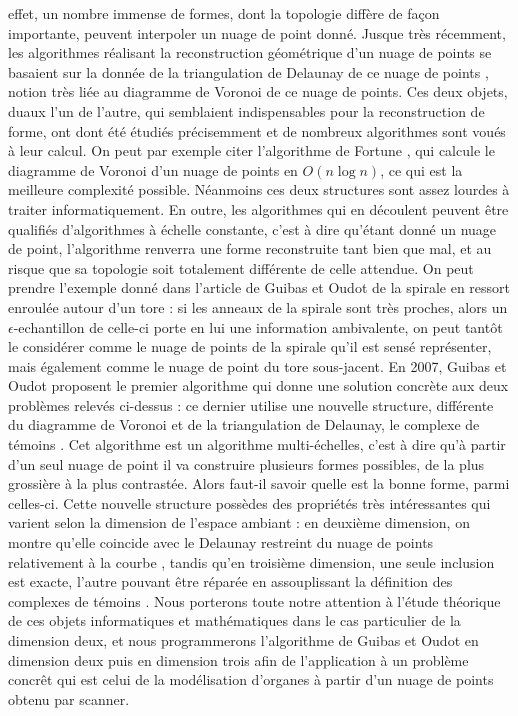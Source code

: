 \documentclass{article}
\begin{document}
effet, un nombre immense de formes, dont la topologie diffère de façon importante, peuvent interpoler un nuage de point donné. Jusque très récemment, les algorithmes réalisant la reconstruction géométrique d'un nuage de points se basaient sur la donnée de la triangulation de Delaunay de ce nuage de points \cite{lyon}, notion très liée au diagramme de Voronoi de ce nuage de points. Ces deux objets, duaux l'un de l'autre, qui semblaient indispensables pour la reconstruction de forme, ont dont été étudiés précisemment et de nombreux algorithmes sont voués à leur calcul. On peut par exemple citer l'algorithme de Fortune \cite{lyon}, qui calcule le diagramme de Voronoi d'un nuage de points en $O(n\log n)$, ce qui est la meilleure complexité possible. Néanmoins ces deux structures sont assez lourdes à traiter informatiquement. En outre, les algorithmes qui en découlent peuvent être qualifiés d'algorithmes à échelle constante, c'est à dire qu'étant donné un nuage de point, l'algorithme renverra une forme reconstruite tant bien que mal, et au risque que sa topologie soit totalement différente de celle attendue. On peut prendre l'exemple donné dans l'article de Guibas et Oudot \cite{witn} de la spirale en ressort enroulée autour d'un tore : si les anneaux de la spirale sont très proches, alors un $\epsilon$-echantillon de celle-ci porte en lui une information ambivalente, on peut tantôt le considérer comme le nuage de points de la spirale qu'il est sensé représenter, mais également comme le nuage de point du tore sous-jacent. En 2007, Guibas et Oudot proposent le premier algorithme qui donne une solution concrète aux deux problèmes relevés ci-dessus : ce dernier utilise une nouvelle structure, différente du diagramme de Voronoi et de la triangulation de Delaunay, le complexe de témoins \cite{main}. Cet algorithme est un algorithme multi-échelles, c'est à dire qu'à partir d'un seul nuage de point il va construire plusieurs formes possibles, de la plus grossière à la plus contrastée. Alors faut-il savoir quelle est la bonne forme, parmi celles-ci. Cette nouvelle structure possèdes des propriétés très intéressantes qui varient selon la dimension de l'espace ambiant : en deuxième dimension, on montre qu'elle coincide avec le Delaunay restreint du nuage de points relativement à la courbe \cite{main}, tandis qu'en troisième dimension, une seule inclusion est exacte, l'autre pouvant être réparée en assouplissant la définition des complexes de témoins \cite{arbi}. Nous porterons toute notre attention à l'étude théorique de ces objets informatiques et mathématiques dans le cas particulier de la dimension deux, et nous programmerons l'algorithme de Guibas et Oudot \cite{webs} en dimension deux puis en dimension trois afin de l'application à un problème concrêt qui est celui de la modélisation d'organes à partir d'un nuage de points obtenu par scanner.
\end{document}
